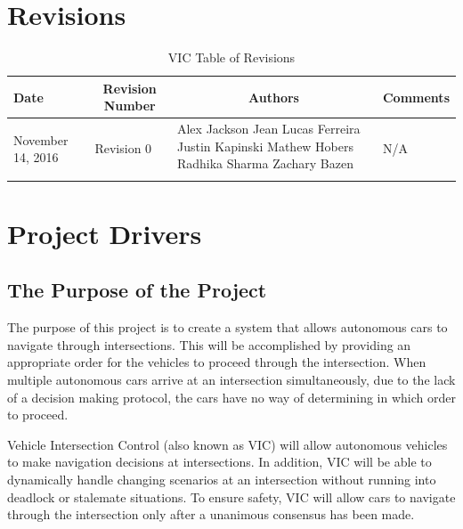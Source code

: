 \documentclass [11pt]{article}
\begin{document}
\section{Revisions}
\begin{longtable}{| p{ } | p{ } | p{ } | p{ } |}

\hline 
\centering \textbf{Date} & 
\multicolumn{1}{c}{\textbf {Revision Number}} &
\multicolumn{1}{|c}{\textbf {Authors}} & 
\multicolumn{1}{|c|}{\textbf {Comments}} \\ \hline

\multirow{4}{*}{\centering November 14, 2016}  & 
\multirow{4}{*}{Revision 0}& 
{Alex Jackson \newline
Jean Lucas Ferreira \newline
Justin Kapinski\newline
Mathew Hobers\newline
Radhika Sharma\newline
Zachary Bazen}
&
 \multirow{4}{*}{N/A} \\ 
\hline 

\caption{VIC Table of Revisions} 
\end{longtable}
\pagebreak



\section {\textbf{Project Drivers}}


\subsection{The Purpose of the Project} 
The purpose of this project is to create a system that allows autonomous cars to navigate through  intersections. This will be accomplished by providing an appropriate order for the vehicles to proceed through the intersection. When multiple autonomous cars arrive at an intersection simultaneously, due to the lack of a decision making protocol, the cars have no way of determining in which order to proceed. \newline


Vehicle Intersection Control (also known as VIC) will allow autonomous vehicles to make navigation decisions at intersections. In addition, VIC will be able to dynamically handle changing scenarios at an intersection without running into deadlock or stalemate situations. To ensure safety, VIC will allow cars to navigate through the intersection only after a unanimous consensus has been made. \newline
\end{document}
